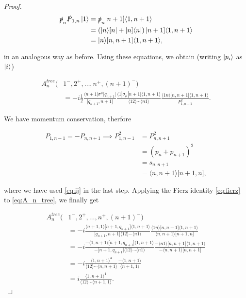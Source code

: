\documentclass{article}
\theoremstyle{definition}
\numberwithin{equation}{section}
\begin{document}
\begin{proof}
\begin{align}
    \slashed{p}_n \slashed{P}_{1,n} \ket{1} &= \slashed{p}_n | n+1 \rbrack \langle 1,n+1 \rangle \\
    &= \left( | n \rangle \lbrack n | + | n \rbrack \langle n | \right) | n+1 \rbrack \langle 1,n+1 \rangle \\
    &= | n \rangle \lbrack n,n+1 \rbrack \langle 1,n+1 \rangle,
\end{align}

in an analogous way as before. Using these equations, we obtain (writing $\ket{p_i}$ as $\ket{i}$)

\begin{align}
    A_n^{tree}(&1^{-}, 2^{+}, \dots , n^{+}, (n+1)^{-}) \\
    &= -i \frac{1}{2} \frac{\langle n+1 | \sigma^{\mu} | q_{n+1} \rbrack }{\lbrack q_{n+1},n+1 \rbrack } \frac{ \langle 1 | \sigma_{\mu} | n+1 \rbrack \langle 1,n+1 \rangle }{ \langle 12 \rangle \cdots \langle n1 \rangle} \frac{ \langle 1n \rangle \lbrack n,n+1 \rbrack \langle 1,n+1 \rangle }{ P_{1,n-1}^2 } \label{eq:A_n_tree}.
\end{align}

We have momentum conservation, therfore

\begin{align}
    P_{1,n-1} = - P_{n,n+1} \implies P_{1,n-1}^2 &= P_{n,n+1}^2 \\
    &= \left( p_n + p_{n+1} \right)^2 \\
    &= s_{n,n+1} \\
    &= \langle n,n+1 \rangle \lbrack n+1,n \rbrack,
\end{align}

where we have used \eqref{eq:ij} in the last step. Applying the Fierz identity \eqref{eq:fierz} to \eqref{eq:A_n_tree}, we finally get

\begin{align}
    A_n^{tree}(&1^{-}, 2^{+}, \dots , n^{+}, (n+1)^{-}) \\
    &= -i \frac{ \langle n+1,1 \rangle \lbrack n+1,q_{n+1} \rbrack \langle 1,n+1 \rangle }{ \lbrack q_{n+1},n+1 \rbrack \langle 12 \rangle \cdots \langle n1 \rangle} \frac{ \langle 1n \rangle \lbrack n,n+1 \rbrack \langle 1,n+1 \rangle }{ \langle n,n+1 \rangle \lbrack n+1,n \rbrack } \\
    &= -i \frac{ - \langle 1,n+1 \rangle \lbrack n+1,q_{n+1} \rbrack \langle 1,n+1 \rangle }{ - \lbrack n+1,q_{n+1} \rbrack \langle 12 \rangle \cdots \langle n1 \rangle} \frac{ - \langle n1 \rangle \lbrack n,n+1 \rbrack \langle 1,n+1 \rangle }{ - \langle n,n+1 \rangle \lbrack n,n+1 \rbrack } \\
    &= -i \frac{ \langle 1,n+1 \rangle^3 }{ \langle 12 \rangle \cdots \langle n,n+1 \rangle } \frac{ - \langle 1,n+1 \rangle }{ \langle n+1,1 \rangle } \\
    &= i \frac{ \langle 1,n+1 \rangle^4 }{ \langle 12 \rangle \cdots \langle n+1,1 \rangle }.
\end{align}


\end{proof}
\end{document}

